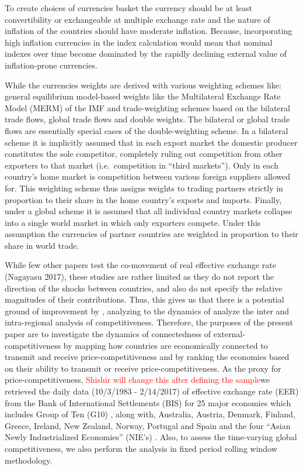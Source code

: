 \documentclass[]{elsarticle} %
\begin{document}
To create choices of currencies basket the currency should be at least
convertibility or exchangeable at multiple exchange rate and the nature
of inflation of the countries should have moderate inflation. Because,
incorporating high inflation currencies in the index calculation would
mean that nominal indexes over time become dominated by the rapidly
declining external value of inflation-prone currencies.

While the currencies weights are derived with various weighting schemes
like: general equilibrium model-based weights like the Multilateral
Exchange Rate Model (MERM) of the IMF and trade-weighting schemes based
on the bilateral trade flows, global trade flows and double weights. The
bilateral or global trade flows are essentially special cases of the
double-weighting scheme. In a bilateral scheme it is implicitly assumed
that in each export market the domestic producer constitutes the sole
competitor, completely ruling out competition from other exporters to
that market (i.e.~competition in ``third markets''). Only in each
country's home market is competition between various foreign suppliers
allowed for. This weighting scheme thus assigns weights to trading
partners strictly in proportion to their share in the home country's
exports and imports. Finally, under a global scheme it is assumed that
all individual country markets collapse into a single world market in
which only exporters compete. Under this assumption the currencies of
partner countries are weighted in proportion to their share in world
trade.

While few other papers test the co-movement of real effective exchange
rate (Nagayasu 2017), these studies are rather limited as they do not
report the direction of the shocks between countries, and also do not
specify the relative magnitudes of their contributions. Thus, this gives
us that there is a potential ground of improvement by , analyzing to the
dynamics of analyze the inter and intra-regional analysis of
competitiveness. Therefore, the purposes of the present paper are to
investigate the dynamics of connectedness of external-competitiveness by
mapping how countries are economically connected to transmit and receive
price-competitiveness and by ranking the economies based on their
ability to transmit or receive price-competitiveness. As the proxy for
price-competitiveness,
\textcolor{red}{Shishir will change this after defining the sample}we
retrieved the daily data (10/3/1983 - 2/14/2017) of effective exchange
rate (EER) from the Bank of International Settlements (BIS) for 25 major
economies which includes Group of Ten (G10) , along with, Australia,
Austria, Denmark, Finland, Greece, Ireland, New Zealand, Norway,
Portugal and Spain and the four ``Asian Newly Industrialized Economies''
(NIE's) . Also, to assess the time-varying global competitiveness, we
also perform the analysis in fixed period rolling window methodology.
\end{document}
